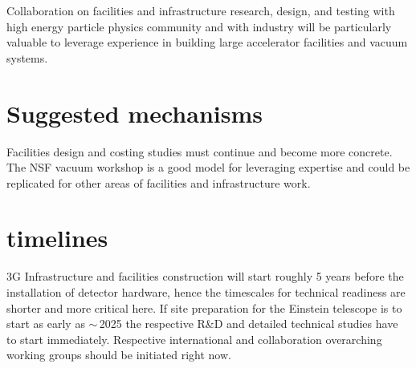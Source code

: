 Collaboration on facilities and infrastructure research, design, and testing with high energy particle physics community and with industry will be particularly valuable to leverage experience in building large accelerator facilities and vacuum systems.

\section{Suggested mechanisms}

Facilities design and costing studies must continue and become more concrete. The NSF vacuum workshop is a good model for leveraging expertise and could be replicated for other areas of facilities and infrastructure work. 

\section{timelines}
3G Infrastructure and facilities construction will start roughly 5 years before the installation of detector hardware, hence the timescales for technical readiness are shorter and more critical here.
If site preparation for the Einstein telescope is to start as early as $\sim$\,2025 the respective R\&D and detailed technical studies have to start immediately. Respective international and collaboration overarching working groups should be initiated right now.